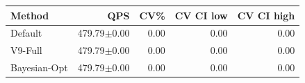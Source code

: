 \begin{tabular}{lrrrr}
\hline
Method & QPS & CV\% & CV CI low & CV CI high \\
\hline
Default & 479.79$\pm$0.00 & 0.00 & 0.00 & 0.00 \\
V9-Full & 479.79$\pm$0.00 & 0.00 & 0.00 & 0.00 \\
Bayesian-Opt & 479.79$\pm$0.00 & 0.00 & 0.00 & 0.00 \\
\hline
\end{tabular}